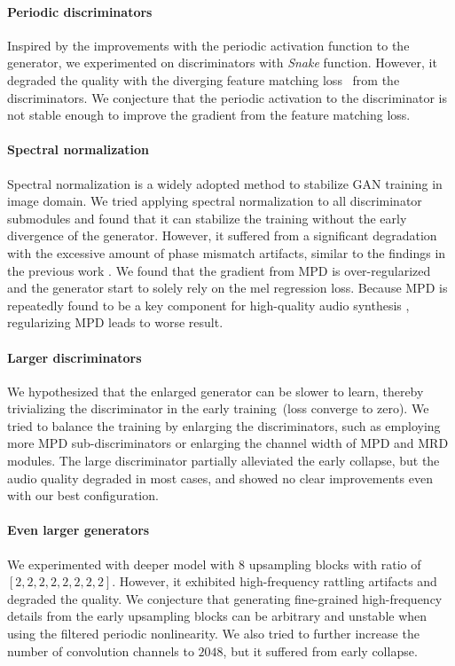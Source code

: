 \documentclass{article} \usepackage{iclr2023_conference,times}
\theoremstyle{plain}
\theoremstyle{definition}
\theoremstyle{remark}
\begin{document}
\paragraph{Periodic discriminators} Inspired by the improvements with the periodic activation function to the generator, we experimented on discriminators with \emph{Snake} function. However, it degraded the quality with the diverging feature matching loss~\citep{kong2020hifi} from the discriminators. We conjecture that the periodic activation to the discriminator is not stable enough to improve the gradient from the feature matching loss.
\paragraph{Spectral normalization} Spectral normalization \citep{miyato2018spectral} is a widely adopted method to stabilize GAN training in image domain. We tried applying spectral normalization to all discriminator submodules and found that it can stabilize the training without the early divergence of the generator. However, it suffered from a significant degradation with the excessive amount of phase mismatch artifacts, similar to the findings in the previous work \citep{kumar2019melgan}. We found that the gradient from MPD is over-regularized and the generator start to solely rely on the mel regression loss. Because MPD is repeatedly found to be a key component for high-quality audio synthesis \citep{kong2020hifi}, regularizing MPD leads to worse result.
\paragraph{Larger discriminators} We hypothesized that the enlarged generator can be slower to learn, thereby trivializing the discriminator in the early training~(loss converge to zero). We tried to balance the training by enlarging the discriminators, such as employing more MPD sub-discriminators or enlarging the channel width of MPD and MRD modules. The large discriminator partially alleviated the early collapse, but the audio quality degraded in most cases, and showed no clear improvements even with our best configuration.
\paragraph{Even larger generators} We experimented with deeper model with 8 upsampling blocks with ratio of $[2, 2, 2, 2, 2, 2, 2, 2]$. However, it exhibited high-frequency rattling artifacts and degraded the quality. We conjecture that generating fine-grained high-frequency details from the early upsampling blocks can be arbitrary \citep{karras2021alias} and unstable when using the filtered periodic nonlinearity. 
We also tried to further increase the number of convolution channels to $2048$, but it suffered from early collapse.
\end{document}
